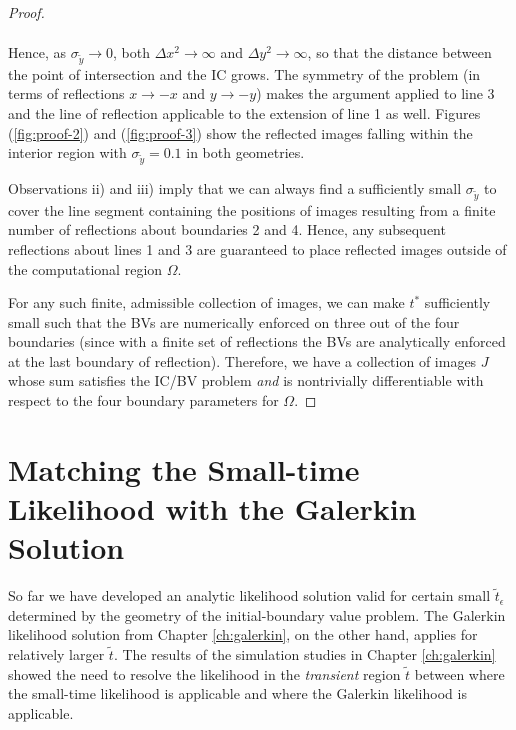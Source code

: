 \begin{proof}
\begin{enumerate}
\begin{align*}
    \end{align*}
    Hence, as $\sigma_{\tilde{y}} \to 0$, both $\Delta x^2 \to \infty$ and
    $\Delta y^2 \to \infty$, so that the distance between the point of
    intersection and the IC grows. The symmetry of the problem (in
    terms of reflections $x \to -x$ and $y \to -y$) makes the argument
    applied to line 3 and the line of reflection applicable to the
    extension of line 1 as well. Figures (\ref{fig:proof-2}) and
    (\ref{fig:proof-3}) show the reflected images falling within the
    interior region with $\sigma_{\tilde{y}} = 0.1$ in both geometries.
  \end{enumerate}
  Observations ii) and iii) imply that we can always find a
  sufficiently small $\sigma_{\tilde{y}}$ to cover the line segment
  containing the positions of images resulting from a finite number of
  reflections about boundaries 2 and 4.  Hence, any subsequent
  reflections about lines 1 and 3 are guaranteed to place reflected
  images outside of the computational region $\Omega$.

  For any such finite, admissible collection of images, we can make
  $t^*$ sufficiently small such that the BVs are numerically
  enforced on three out of the four boundaries (since with a finite
  set of reflections the BVs are analytically enforced at the last
  boundary of reflection). Therefore, we have a collection of images
  $J$ whose sum satisfies the IC/BV problem \textit{and} is
  nontrivially differentiable with respect to the four boundary
  parameters for $\Omega$.
\end{proof}

\section{Matching the Small-time Likelihood with the Galerkin Solution}
So far we have developed an analytic likelihood solution valid for
certain small $\tilde{t}_\epsilon$ determined by the geometry of the
initial-boundary value problem. The Galerkin likelihood solution from
Chapter \ref{ch:galerkin}, on the other hand, applies for relatively
larger $\tilde{t}$.  The results of the simulation studies in Chapter
\ref{ch:galerkin} showed the need to resolve the likelihood in the
\textit{transient} region $\tilde{t}$ between where the small-time
likelihood is applicable and where the Galerkin likelihood is
applicable.


